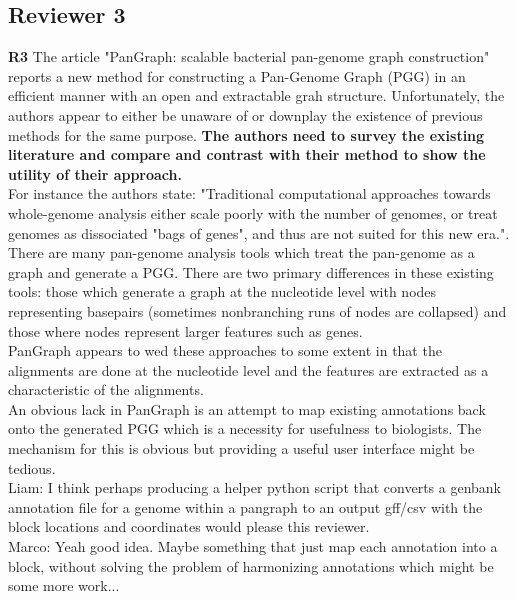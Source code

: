 \documentclass[aps,rmp,onecolumn]{revtex4-1}
\newcommand{\review}[1]{\textbf{#1}}
\newcommand{\Marco}[1]{{\color{gray}Marco: #1}}
\newcommand{\Liam}[1]{{\color{teal}Liam: #1}}
\begin{document}
\subsection*{Reviewer 3}

\review{R3} The article "PanGraph: scalable bacterial pan-genome graph construction" reports a new method for constructing a Pan-Genome Graph (PGG) in an efficient manner with an open and extractable grah structure. Unfortunately, the authors appear to either be unaware of or downplay the existence of previous methods for the same purpose.\textbf{ The authors need to survey the existing literature and compare and contrast with their method to show the utility of their approach.}\\

For instance the authors state: "Traditional computational approaches towards whole-genome analysis either scale poorly with the number of genomes, or treat genomes as dissociated "bags of genes", and thus are not suited for this new era.". There are many pan-genome analysis tools which treat the pan-genome as a graph and generate a PGG. There are two primary differences in these existing tools: those which generate a graph at the nucleotide level with nodes representing basepairs (sometimes nonbranching runs of nodes are collapsed) and those where nodes represent larger features such as genes.\\
PanGraph appears to wed these approaches to some extent in that the alignments are done at the nucleotide level and the features are extracted as a characteristic of the alignments.\\

An obvious lack in PanGraph is an attempt to map existing annotations back onto the generated PGG which is a necessity for usefulness to biologists. The mechanism for this is obvious but providing a useful user interface might be tedious.\\
\Liam{I think perhaps producing a helper python script that converts a genbank annotation file for a genome within a pangraph to an output gff/csv with the block locations and coordinates would please this reviewer.}\\
\Marco{Yeah good idea. Maybe something that just map each annotation into a block, without solving the problem of harmonizing annotations which might be some more work...}\\
\end{document}
